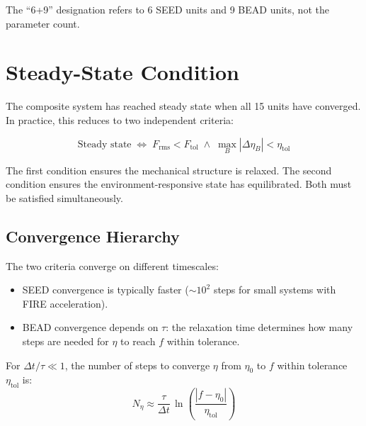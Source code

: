 \documentclass[11pt, a4paper, oneside]{article}
\begin{document}
\noindent The ``6+9'' designation refers to 6 SEED units and 9 BEAD
units, not the parameter count.

\newpage
\section{Steady-State Condition}
\label{sec:steady-state}

The composite system has reached steady state when all 15 units have
converged.  In practice, this reduces to two independent criteria:

\begin{equation}
  \boxed{
    \text{Steady state}
    \;\iff\;
    F_{\text{rms}} < F_{\text{tol}}
    \;\wedge\;
    \max_B |\Delta\eta_B| < \eta_{\text{tol}}
  }
  \label{eq:steady-state}
\end{equation}

The first condition ensures the mechanical structure is relaxed.
The second condition ensures the environment-responsive state has
equilibrated.  Both must be satisfied simultaneously.

\subsection{Convergence Hierarchy}
\label{sec:convergence-hierarchy}

The two criteria converge on different timescales:
\begin{itemize}
  \item SEED convergence is typically faster ($\sim 10^2$ steps for small
        systems with FIRE acceleration).
  \item BEAD convergence depends on $\tau$: the relaxation time
        determines how many steps are needed for $\eta$ to reach
        $f$ within tolerance.
\end{itemize}

\noindent For $\Delta t / \tau \ll 1$, the number of steps to converge
$\eta$ from $\eta_0$ to $f$ within tolerance $\eta_{\text{tol}}$ is:
%
\begin{equation}
  N_\eta \approx \frac{\tau}{\Delta t}\,
  \ln\!\left(\frac{|f - \eta_0|}{\eta_{\text{tol}}}\right)
  \label{eq:eta-convergence-steps}
\end{equation}
\end{document}
